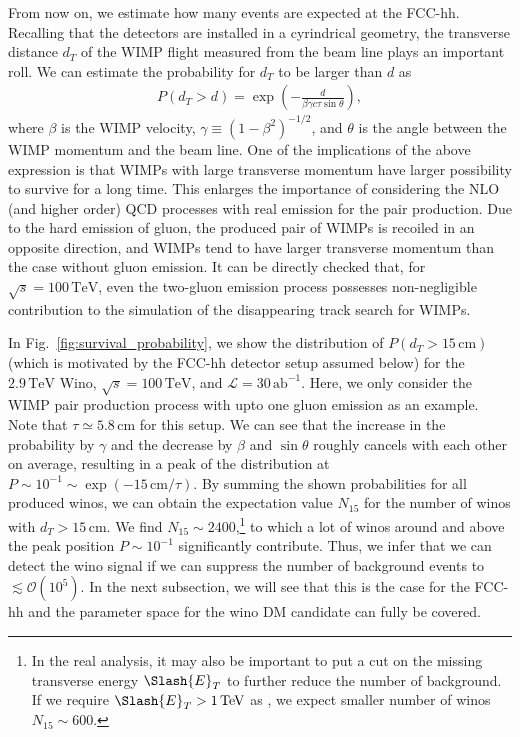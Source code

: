 \documentclass[12pt,twoside,book]{article}
\begin{document}
From now on, we estimate how many events are expected at the FCC-hh.
Recalling that the detectors are installed in a cyrindrical geometry, the transverse distance $d_T$ of the WIMP flight measured from the beam line plays an important roll.
We can estimate the probability for $d_T$ to be larger than $d$ as
\begin{align}
  P(d_T > d) = \exp \left( -\frac{d}{\beta \gamma c \tau \sin\theta} \right),
  \label{eq:survival_probability}
\end{align}
where $\beta$ is the WIMP velocity, $\gamma \equiv (1-\beta^2)^{-1/2}$, and $\theta$ is the angle between the WIMP momentum and the beam line.
One of the implications of the above expression is that WIMPs with large transverse momentum have larger possibility to survive for a long time.
This enlarges the importance of considering the NLO (and higher order) QCD processes with real emission for the pair production.
Due to the hard emission of gluon, the produced pair of WIMPs is recoiled in an opposite direction, and WIMPs tend to have larger transverse momentum than the case without gluon emission.
It can be directly checked that, for $\sqrt{s}=100\,\mathrm{TeV}$, even the two-gluon emission process possesses non-negligible contribution to the simulation of the disappearing track search for WIMPs.

In Fig.~\ref{fig:survival_probability}, we show the distribution of $P(d_T > 15\,\mathrm{cm})$ (which is motivated by the FCC-hh detector setup assumed below) for the $2.9\,\mathrm{TeV}$ Wino, $\sqrt{s} = 100\,\mathrm{TeV}$, and $\mathcal{L} = 30\,\mathrm{ab}^{-1}$.
Here, we only consider the WIMP pair production process with upto one gluon emission as an example.
Note that $\tau \simeq 5.8\,\mathrm{cm}$ for this setup.
We can see that the increase in the probability by $\gamma$ and the decrease by $\beta$ and $\sin\theta$ roughly cancels with each other on average, resulting in a peak of the distribution at $P \sim 10^{-1} \sim \exp (-15\,\mathrm{cm} / \tau)$.
By summing the shown probabilities for all produced winos, we can obtain the expectation value $N_{15}$ for the number of winos with $d_T > 15\,\mathrm{cm}$.
We find $N_{15} \sim 2400$,\footnote
{
  In the real analysis, it may also be important to put a cut on the missing transverse energy $\Slash{E}_T$ to further reduce the number of background.
  If we require $\Slash{E}_T > 1\,\mathrm{TeV}$ as \cite{Asai:2019wst}, we expect smaller number of winos $N_{15} \sim 600$.
}
to which a lot of winos around and above the peak position $P \sim 10^{-1}$ significantly contribute.
Thus, we infer that we can detect the wino signal if we can suppress the number of background events to $\lesssim \mathcal{O}(10^5)$.
In the next subsection, we will see that this is the case for the FCC-hh and the parameter space for the wino DM candidate can fully be covered.
\end{document}
